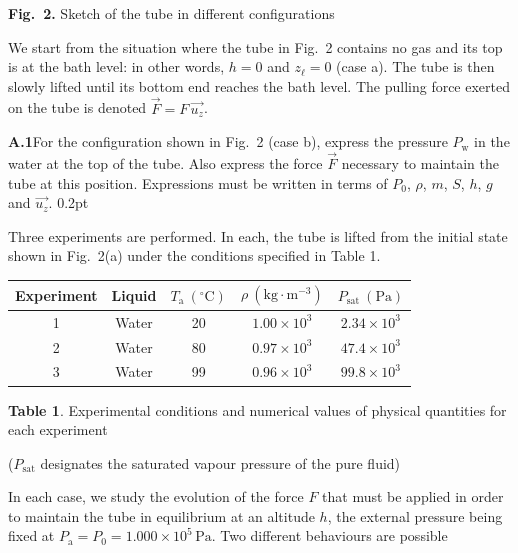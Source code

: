 \begin{center}\textbf{Fig.~2.} Sketch of the tube in different configurations\end{center}

We start from the situation where the tube in Fig.~2 contains no gas and its
top is at the bath level: in other words, $h = 0$ and $z_\ell = 0$ (case a).
The tube is then slowly lifted until its bottom end reaches the bath level.
The pulling force exerted on the tube is denoted
$\overrightarrow{F} = F\,\overrightarrow{u_z}$.

\textbf{A.1}\quad For the configuration shown in Fig.~2 (case b), express the
pressure $P_\mathrm{w}$ in the water at the top of the tube. Also express the
force $\overrightarrow{F}$ necessary to maintain the tube at this position.
Expressions must be written in terms of $P_0$, $\rho$, $m$, $S$, $h$, $g$ and
$\overrightarrow{u_z}$. \hfill 0.2pt

Three experiments are performed. In each, the tube is lifted from the initial
state shown in Fig.~2(a) under the conditions specified in Table 1.

\begin{center}
\begin{tabular}{|c|c|c|c|c|}
\hline
Experiment & Liquid & $T_\mathrm{a}\ (^\circ\mathrm{C})$ & $\rho\ (\mathrm{kg\cdot m^{-3}})$ & $P_\mathrm{sat}\ (\mathrm{Pa})$ \\
\hline
1 & Water & 20 & $1.00 \times 10^3$ & $2.34 \times 10^3$ \\
\hline
2 & Water & 80 & $0.97 \times 10^3$ & $47.4 \times 10^3$ \\
\hline
3 & Water & 99 & $0.96 \times 10^3$ & $99.8 \times 10^3$ \\
\hline
\end{tabular}
\end{center}

\begin{center}\textbf{Table 1}. Experimental conditions and numerical values
of physical quantities for each experiment

($P_\mathrm{sat}$ designates the saturated vapour pressure of the pure
fluid)\end{center}

In each case, we study the evolution of the force $F$ that must be applied in
order to maintain the tube in equilibrium at an altitude $h$, the external
pressure being fixed at
$P_\mathrm{a} = P_0 = 1.000 \times 10^5\,\mathrm{Pa}$. Two different
behaviours are possible


